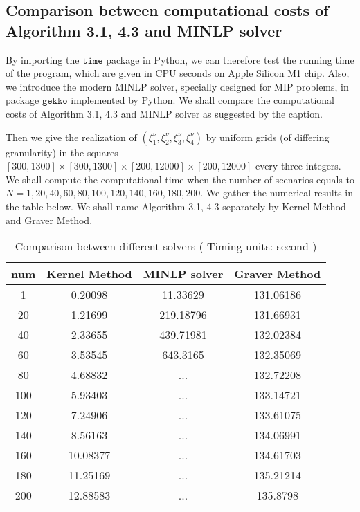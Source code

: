 \documentclass{article}
\theoremstyle{plain}
\theoremstyle{definition}
\begin{document}
\begin{propsition}
\subsection{Comparison between computational costs of Algorithm 3.1, 4.3 and MINLP solver}
By importing the $\texttt{time}$ package in Python,  we can therefore test the running time of the program, which are given in CPU seconds on Apple Silicon M1 chip. Also, we introduce the modern MINLP solver, specially designed for MIP problems, in package $\texttt{gekko}$ implemented by Python. We shall compare the computational costs of Algorithm 3.1, 4.3 and MINLP solver as suggested by the caption.

Then we give the realization of $\left(\xi_{1}^{\nu}, \xi_{2}^{\nu}, \xi_{3}^{\nu}, \xi_{4}^{\nu}\right)$   by uniform grids (of differing granularity) in the squares $ [300,1300] \times [300,1300]\times [200,12000] \times[200,12000]$ every three integers. We shall compute the computational time when the number of scenarios equals to $N=1,20,40,60,80	,100,120,140,160,180,200.$ We gather the numerical results in the table below. We shall name Algorithm 3.1, 4.3 separately by Kernel Method and Graver Method.

\begin{table}[htbp]
\centering
\caption{Comparison between different solvers ( Timing units: second )}
\begin{tabular}{|c|c|c|c|}
\hline
num  & Kernel Method & MINLP solver & Graver Method \\
\hline
1 & 0.20098  & 11.33629  & 131.06186   \\
20 & 1.21699  & 219.18796 & 131.66931   \\
40 & 2.33655  & 439.71981 & 132.02384   \\
60 & 3.53545  & 643.3165  & 132.35069   \\
80 & 4.68832  & ...       & 132.72208  \\
100 & 5.93403  & ...       & 133.14721   \\
120 & 7.24906  & ...       & 133.61075  \\
140 & 8.56163  & ...       & 134.06991  \\
160 & 10.08377 & ...       & 134.61703   \\
180 & 11.25169 & ...       & 135.21214  \\
200 & 12.88583 & ...       & 135.8798  \\
 \hline
\end{tabular}
\end{table}


\end{propsition}
\end{document}
